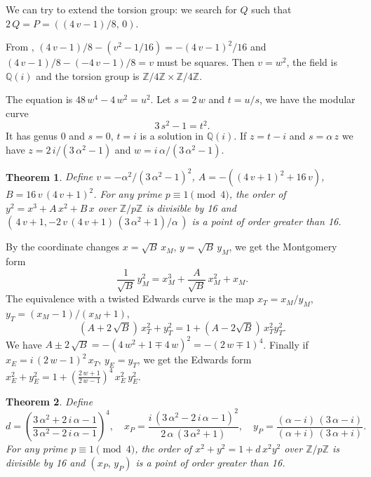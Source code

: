 \documentclass[a4paper, 11pt, pdftex]{report}
\theoremstyle{plain}
\newtheorem{theorem}{Theorem}[chapter]
\theoremstyle{definition}
\begin{document}
We can try to extend the torsion group: we search for $Q$ such that $2\,Q = P = ((4\,v - 1)/8,\, 0)$.

From \cite[Theorem 4.2]{Knapp1}, $(4\,v - 1)/8 - (v^2 - 1/16) = -(4\,v - 1)^2 / 16$ and
$(4\,v - 1)/8 - (-4\,v - 1)/8 = v$ must be squares. Then $v = w^2$, the field is
$\mathbb{Q}(i)$ and the torsion group is $\mathbb{Z}/4\mathbb{Z} \times \mathbb{Z}/4\mathbb{Z}$.

The equation is $48\,w^4 - 4\,w^2 = u^2$. Let $s = 2\,w$ and $t = u / s$, we have the modular curve
$$3\,s^2 - 1 = t^2.$$
It has genus 0 and $s = 0$, $t = i$ is a solution in $\mathbb{Q}(i)$. If $z = t - i$
and $s = \alpha\,z$ we have $z = 2\,i / (3\,\alpha^2 - 1)$ and $w = i\, \alpha / (3\,\alpha^2 - 1)$.

\begin{theorem}
Define $v = -\alpha^2 / (3\,\alpha^2 - 1)^2$, $A = -((4\,v+1)^2 + 16\,v)$,
$B = 16\,v\,(4\,v + 1)^2$. For any prime $p \equiv 1 \pmod{4}$,
the order of $y^2 = x^3 + A\, x^2 + B\, x$ over $\mathbb{Z}/p\mathbb{Z}$ is divisible by 16
and $(\,4\,v + 1, - 2\,v\,(4\,v + 1)\,(3\,\alpha^2 + 1)/\alpha\,)$ is a point of order
greater than 16.
\end{theorem}

By the coordinate changes $x = \sqrt{B}\,x_M$, $y = \sqrt{B}\,y_M$, we get the Montgomery form
$$\frac{1}{\sqrt{B}}\, y_M^2 = x_M^3 + \frac{A}{\sqrt{B}}\, x_M^2 + x_M.$$
The equivalence with a twisted Edwards curve is the map $x_T = x_M / y_M$,
$y_T = (x_M - 1)/(x_M + 1)$,
$$(A + 2\,\sqrt{B})\,x_T^2 + y_T^2 = 1 + (A - 2\sqrt{B})\,x_T^2y_T^2.$$
We have $A \pm 2\,\sqrt{B} = -(4\,w^2+1 \mp 4\,w)^2
= -(2\,w \mp 1)^4$.
Finally if $x_E = i\,(2\,w - 1)^2\,x_T$, $y_E = y_T$, we get the Edwards form
$x_E^2 + y_E^2 = 1 + \left(\frac{2\,w + 1}{2\,w - 1}\right)^4\,x_E^2\,y_E^2$.

\begin{theorem}
Define
$$d = \left( \frac{3\,\alpha^2 + 2\,i\,\alpha - 1}{3\,\alpha^2 - 2\,i\,\alpha -1} \right)^4,\quad
x_P = \frac{i \, (3\,\alpha^2 - 2\,i\,\alpha - 1)^2}{2\, \alpha\, (3\,\alpha^2 + 1)},\quad
y_P = \frac{(\alpha - i)\,(3\,\alpha - i)}{(\alpha + i)\,(3\,\alpha + i)}.$$
For any prime $p \equiv 1 \pmod{4}$, the order of $x^2 + y^2 = 1 + d\,x^2y^2$ over
$\mathbb{Z}/p\mathbb{Z}$ is divisible by 16 and $(x_P,\,y_P)$ is a point of order greater than 16.
\end{theorem}






\iffalse
\end{document}
